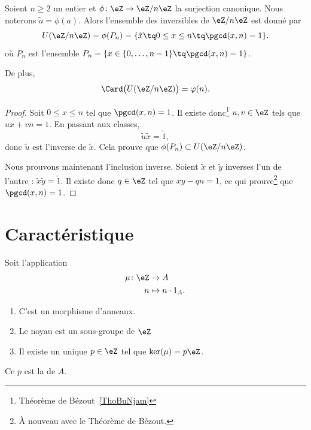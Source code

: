 \begin{proposition}     \label{PropZpintssiprempUzn}
    Soient \( n\geq 2\) un entier et \( \phi\colon \eZ\to \eZ/n\eZ\) la surjection canonique. Nous noterons \( \tilde a=\phi(a)\). Alors l'ensemble des inversibles de \( \eZ/n\eZ\) est donné par
    \begin{equation}
        U(\eZ/n\eZ)=\phi(P_n)=\{ \tilde x\tq 0\leq x\leq n\tq\pgcd(x,n)=1 \}.
    \end{equation}
    où \( P_n\) est l'ensemble $P_n=\{ x\in\{ 0,\ldots,n-1 \}\tq\pgcd(x,n)=1 \}$.

    De plus,
    \begin{equation}
        \Card\big( U(\eZ/n\eZ) \big)=\varphi(n).
    \end{equation}
\end{proposition}

\begin{proof}
    Soit \( 0\leq x\leq n\) tel que \( \pgcd(x,n)=1\). Il existe donc\footnote{Théorème de Bézout~\ref{ThoBuNjam}} \( u,v\in\eZ\) tels que \( ux+vn=1\). En passant aux classes,
    \begin{equation}
        \tilde u\tilde x=\tilde 1,
    \end{equation}
    donc \( \tilde u\) est l'inverse de \( \tilde x\). Cela prouve que \( \phi(P_n)\subset U(\eZ/n\eZ)\).

    Nous prouvons maintenant l'inclusion inverse. Soient \( \tilde x\) et \( \tilde y\) inverses l'un de l'autre : $\tilde x\tilde y=\tilde 1$. Il existe donc \( q\in\eZ\) tel que \( xy-qn=1\), ce qui prouve\footnote{À nouveau avec le Théorème de Bézout.} que \( \pgcd(x,n)=1\).
\end{proof}

\section{Caractéristique}

\begin{lemmaDef}        \label{LEMDEFooVEWZooUrPaDw}
    Soit l'application
    \begin{equation}
        \begin{aligned}
            \mu\colon \eZ&\to A \\
            n&\mapsto n\cdot 1_A .
        \end{aligned}
    \end{equation}
    \begin{enumerate}
        \item
            C'est un morphisme d'anneaux.
        \item
            Le noyau est un sous-groupe de \( \eZ\)
        \item
            Il existe un unique \( p\in \eZ\) tel que \( \ker(\mu)=p\eZ\).
    \end{enumerate}
    Ce \( p\) est la  de \( A\).
\end{lemmaDef}

